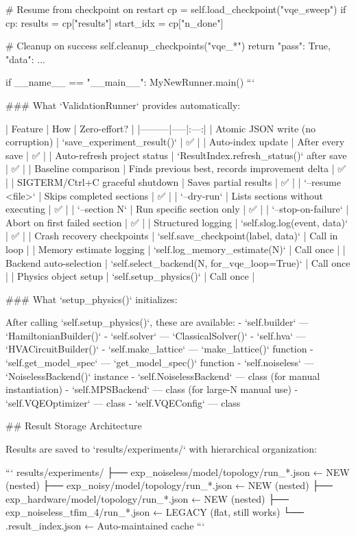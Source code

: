        # Resume from checkpoint on restart
        cp = self.load_checkpoint("vqe_sweep")
        if cp:
            results = cp["results"]
            start_idx = cp["n_done"]

        # Cleanup on success
        self.cleanup_checkpoints("vqe_*")
        return {"pass": True, "data": {...}}

if __name__ == "__main__":
    MyNewRunner.main()
```

### What `ValidationRunner` provides automatically:

| Feature | How | Zero-effort? |
|---------|-----|:---:|
| Atomic JSON write (no corruption) | `save_experiment_result()` | ✅ |
| Auto-index update | After every save | ✅ |
| Auto-refresh project status | `ResultIndex.refresh_status()` after save | ✅ |
| Baseline comparison | Finds previous best, records improvement delta | ✅ |
| SIGTERM/Ctrl+C graceful shutdown | Saves partial results | ✅ |
| `--resume <file>` | Skips completed sections | ✅ |
| `--dry-run` | Lists sections without executing | ✅ |
| `--section N` | Run specific section only | ✅ |
| `--stop-on-failure` | Abort on first failed section | ✅ |
| Structured logging | `self.slog.log(event, data)` | ✅ |
| Crash recovery checkpoints | `self.save_checkpoint(label, data)` | Call in loop |
| Memory estimate logging | `self.log_memory_estimate(N)` | Call once |
| Backend auto-selection | `self.select_backend(N, for_vqe_loop=True)` | Call once |
| Physics object setup | `self.setup_physics()` | Call once |

### What `setup_physics()` initializes:

After calling `self.setup_physics()`, these are available:
- `self.builder` — `HamiltonianBuilder()`
- `self.solver` — `ClassicalSolver()`
- `self.hva` — `HVACircuitBuilder()`
- `self.make_lattice` — `make_lattice()` function
- `self.get_model_spec` — `get_model_spec()` function
- `self.noiseless` — `NoiselessBackend()` instance
- `self.NoiselessBackend` — class (for manual instantiation)
- `self.MPSBackend` — class (for large-N manual use)
- `self.VQEOptimizer` — class
- `self.VQEConfig` — class

## Result Storage Architecture

Results are saved to `results/experiments/` with hierarchical organization:

```
results/experiments/
├── exp_noiseless/{model}/{topology}/run_*.json   ← NEW (nested)
├── exp_noisy/{model}/{topology}/run_*.json       ← NEW (nested)
├── exp_hardware/{model}/{topology}/run_*.json    ← NEW (nested)
├── exp_noiseless_tfim_4/run_*.json               ← LEGACY (flat, still works)
└── .result_index.json                            ← Auto-maintained cache
```

